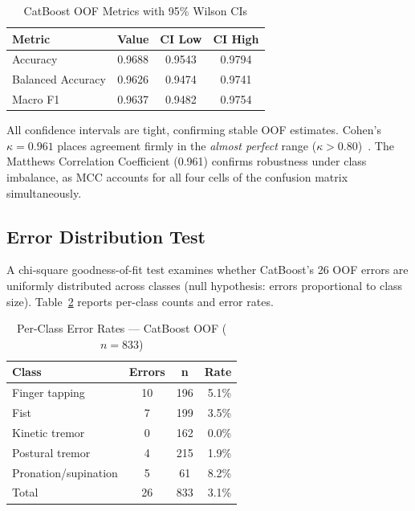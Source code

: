 \documentclass[11pt,twocolumn]{article}
\begin{document}
\begin{table}[H]
\centering
\caption{CatBoost OOF Metrics with 95\% Wilson CIs}
\label{tab:ci}
\small
\setlength{\tabcolsep}{3.5pt}
\begin{tabular}{lccc}
\toprule
\textbf{Metric} & \textbf{Value} & \textbf{CI Low} & \textbf{CI High} \\
\midrule
Accuracy          & 0.9688 & 0.9543 & 0.9794 \\
Balanced Accuracy & 0.9626 & 0.9474 & 0.9741 \\
Macro F1          & 0.9637 & 0.9482 & 0.9754 \\

\bottomrule
\end{tabular}
\end{table}
 
All confidence intervals are tight, confirming stable OOF estimates. Cohen's $\kappa = 0.961$ places agreement firmly in the \textit{almost perfect} range ($\kappa > 0.80$)~\cite{landis1977}. The Matthews Correlation Coefficient (0.961) confirms robustness under class imbalance, as MCC accounts for all four cells of the confusion matrix simultaneously.
 
\subsection{Error Distribution Test}
 
A chi-square goodness-of-fit test examines whether CatBoost's 26 OOF errors are uniformly distributed across classes (null hypothesis: errors proportional to class size). Table~\ref{tab:errors} reports per-class counts and error rates.
 
\begin{table}[H]
\centering
\caption{Per-Class Error Rates --- CatBoost OOF ($n=833$)}
\label{tab:errors}
\small
\setlength{\tabcolsep}{4pt}
\begin{tabular}{lccr}
\toprule
\textbf{Class} & \textbf{Errors} & \textbf{n} & \textbf{Rate} \\
\midrule
Finger tapping       & 10 & 196 & 5.1\% \\
Fist                 &  7 & 199 & 3.5\% \\
Kinetic tremor       &  0 & 162 & 0.0\% \\
Postural tremor      &  4 & 215 & 1.9\% \\
Pronation/supination &  5 &  61 & 8.2\% \\
\midrule
Total                & 26 & 833 & 3.1\% \\
\bottomrule
\end{tabular}
\end{table}
 
\end{document}
